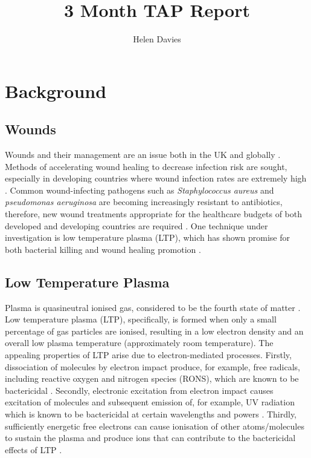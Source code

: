 \documentclass[11pt, oneside]{article}   	%
\title{3 Month TAP Report}
\author{Helen Davies}
\date{}							%
\begin{document}
\maketitle

\section*{Background}

\subsection*{Wounds}

Wounds and their management are an issue both in the UK and globally \cite{Posnett2008burden}.
Methods of accelerating wound healing to decrease infection risk are sought, especially in developing countries where wound infection rates are extremely high \cite{Kihla2014risk}. 
Common wound-infecting pathogens such as \textit{Staphylococcus aureus} and \textit{pseudomonas aeruginosa} \cite{Church2006burn, Bowler2001wound} are becoming increasingly resistant to antibiotics, therefore, new wound treatments appropriate for the healthcare budgets of both developed and developing countries are required \cite{Chambers2009waves, Godebo2013multidrug, Howell2005a}.
One technique under investigation is low temperature plasma (LTP), which has shown promise for both bacterial killing and wound healing promotion \cite{Kong2009plasma, Kramer2013suitability, Isbary2012successful, Isbary2010a}.


\subsection*{Low Temperature Plasma}

Plasma is quasineutral ionised gas, considered to be the fourth state of matter \cite{Fridman2013plasmamedicine}.
Low temperature plasma (LTP), specifically, is formed when only a small percentage of gas particles are ionised, resulting in a low electron density and an overall low plasma temperature (approximately room temperature).
The appealing properties of LTP arise due to electron-mediated processes.
Firstly, dissociation of molecules by electron impact produce, for example, free radicals, including reactive oxygen and nitrogen species (RONS), which are known to be bactericidal \cite{Kong2009plasma}.
Secondly, electronic excitation from electron impact causes excitation of molecules and subsequent emission of, for example, UV radiation which is known to be bactericidal at certain wavelengths and powers \cite{Laroussi2004evaluation}.
Thirdly, sufficiently energetic free electrons can cause ionisation of other atoms/molecules to sustain the plasma and produce ions that can contribute to the bactericidal effects of LTP \cite{Mendis2000a, Laroussi2002nonthermal}.
\end{document}
